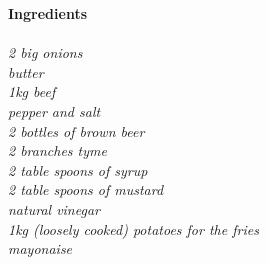 \documentclass{article}
\newcommand{\sidebarsection}[1]{
    \large\textcolor{darkcol}{\textbf{#1}}
}
\newcommand{\ingredientitem}[1]{
    \vspace{3pt}
    \normalsize\emph{#1}
    \vspace{3pt}
}
\begin{document}
\begin{paracol}{2}
\begin{leftcolumn}
\begin{enumerate}[wide, labelwidth=!, labelindent=0pt]
\end{enumerate}
\end{leftcolumn}

\begin{rightcolumn}

\sidebarsection{Ingredients} \\ \\
\ingredientitem{2 big onions}\\ %
\ingredientitem{butter}\\
\ingredientitem{1kg beef}\\
\ingredientitem{pepper and salt}\\
\ingredientitem{2 bottles of brown beer}\\
\ingredientitem{2 branches tyme}\\
\ingredientitem{2 table spoons of syrup}\\
\ingredientitem{2 table spoons of mustard}\\
\ingredientitem{natural vinegar}\\
\ingredientitem{1kg (loosely cooked) potatoes for the fries}\\
\ingredientitem{mayonaise}\\

\end{rightcolumn}
\clearpage
\end{paracol}
\end{document}
